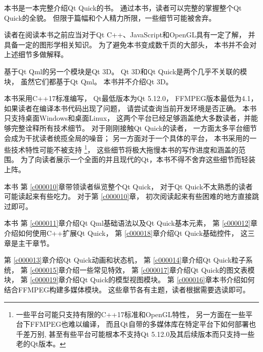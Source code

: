 本书是一本完整介绍Qt Quick的书。
通过本书，读者可以完整的掌握整个Qt Quick的全貌。
但限于篇幅和个人精力所限，一些细节可能被舍弃。

读者在阅读本书之前应当对于Qt C++、JavaScript和OpenGL具有一定了解，
并具备一定的图形学相关知识。
为了避免本书变成数千页的大部头，
本书并不会对上述细节多做解释。

基于Qt Qml的另一个模块是Qt 3D。
Qt 3D和Qt Quick是两个几乎不关联的模块，
虽然它们都基于Qt Qml。
本书并不介绍Qt 3D。

本书采用C++17标准编写，
Qt最低版本为Qt 5.12.0，
FFMPEG版本最低为4.1，
如果读者在编译本书代码出现了问题，
请尝试查询当前开发环境是否正确。
本书只支持桌面Windows和桌面Linux，
这两个平台已经足够涵盖绝大多数读者，并能够完整诠释所有技术细节。
对于刚刚接触Qt Quick的读者，
一方面太多平台细节会成为干扰读者统揽全局的噪音；
另一方面对于一个具体的平台，
本书采用的一些技术特性可能不被支持
\footnote{
一些平台可能只支持有限的C++17标准和OpenGL特性，
另一方面在一些平台下FFMPEG也难以编译，
而且Qt自带的多媒体库在特定平台下如何部署也千差万别,
甚至有些平台可能根本不支持Qt 5.12.0及其后续版本而只支持一些老的Qt版本。
}，
这些细节将极大拖慢本书的写作进度和涵盖的范围。
为了向读者展示一个全面的并且现代的Qt，本书不得不舍弃这些细节而轻装上阵。

本书
第 \ref{c000010}章带领读者纵览整个Qt Quick，
对于Qt Quick不太熟悉的读者可能读起来有些吃力。
对于第 \ref{c000010}章，
初次阅读起来有些困难的地方直接跳过即可。

本书
第 \ref{c000011}章介绍Qt Qml基础语法以及Qt Quick基本元素，
第 \ref{c000012}章介绍如何使用C++扩展Qt Quick，
第 \ref{c000018}章介绍Qt Quick基础控件，
这三章是主干章节。

第 \ref{c000013}章介绍Qt Quick动画和状态机，
第 \ref{c000014}章介绍Qt Quick粒子系统，
第 \ref{c000015}章介绍一些常见特效，
第 \ref{c000017}章介绍Qt Quick的图文表模块，
第 \ref{c000019}章介绍Qt Quick的模型视图模块。
第 \ref{c000016}章本书介绍如何结合FFMPEG构建多媒体模块。
这些章节各有主题，读者根据需要选读即可。







